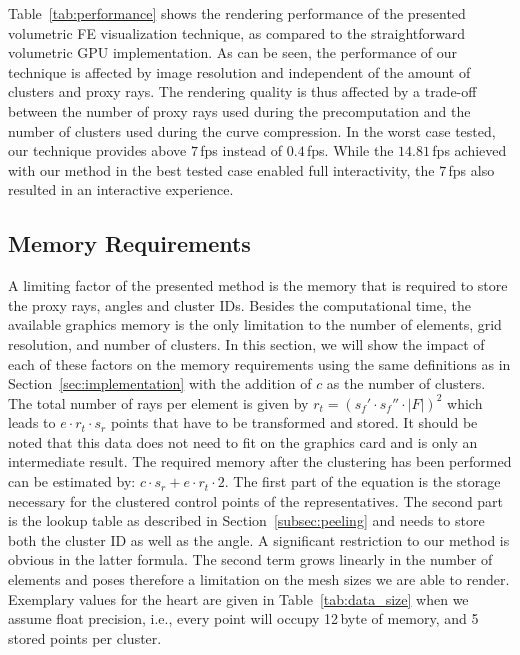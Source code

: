 \documentclass[journal]{vgtc}                %
\begin{document}
Table~\ref{tab:performance} shows the rendering performance of the presented volumetric FE visualization technique, as compared to the straightforward volumetric GPU implementation. As can be seen, the performance of our technique is affected by image resolution and independent of the amount of clusters and proxy rays. The rendering quality is thus affected by a trade-off between the number of proxy rays used during the precomputation and the number of clusters used during the curve compression. In the worst case tested, our technique provides above $7$\,fps instead of $0.4$\,fps. While the $14.81$\,fps achieved with our method in the best tested case enabled full interactivity, the $7$\,fps also resulted in an interactive experience.
%
%
%
\subsection{Memory Requirements}\label{subsec:memory}
A limiting factor of the presented method is the memory that is required to store the proxy rays, angles and cluster IDs. Besides the computational time, the available graphics memory is the only limitation to the number of elements, grid resolution, and number of clusters. In this section, we will show the impact of each of these factors on the memory requirements using the same definitions as in Section~\ref{sec:implementation} with the addition of $c$ as the number of clusters. The total number of rays per element is given by $r_t = (s_f' \cdot s_f'' \cdot \left|F\right|)^2$ which leads to $e \cdot r_t \cdot s_r$ points that have to be transformed and stored. It should be noted that this data does not need to fit on the graphics card and is only an intermediate result. The required memory after the clustering has been performed can be estimated by: $c \cdot s_r + e \cdot r_t\cdot 2$. The first part of the equation is the storage necessary for the clustered control points of the representatives. The second part is the lookup table as described in Section~\ref{subsec:peeling} and needs to store both the cluster ID as well as the angle. A significant restriction to our method is obvious in the latter formula. The second term grows linearly in the number of elements and poses therefore a limitation on the mesh sizes we are able to render. Exemplary values for the heart are given in Table~\ref{tab:data_size} when we assume float precision, i.e., every point will occupy 12\,byte of memory, and 5 stored points per cluster.
%
%
%
\end{document}
